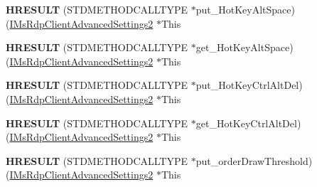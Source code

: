 \begin{DoxyCompactItemize}
\item 
\mbox{\label{struct_m_s_t_s_c_lib_1_1_i_ms_rdp_client_advanced_settings2_vtbl_adf7ed881bcf5a97c28399ccfc1acc3a0}} 
{\bfseries H\+R\+E\+S\+U\+LT} (S\+T\+D\+M\+E\+T\+H\+O\+D\+C\+A\+L\+L\+T\+Y\+PE $\ast$put\+\_\+\+Hot\+Key\+Alt\+Space)(\hyperlink{interface_m_s_t_s_c_lib_1_1_i_ms_rdp_client_advanced_settings2}{I\+Ms\+Rdp\+Client\+Advanced\+Settings2} $\ast$This
\item 
\mbox{\label{struct_m_s_t_s_c_lib_1_1_i_ms_rdp_client_advanced_settings2_vtbl_a23be6ec561ff06251bdad435742d5410}} 
{\bfseries H\+R\+E\+S\+U\+LT} (S\+T\+D\+M\+E\+T\+H\+O\+D\+C\+A\+L\+L\+T\+Y\+PE $\ast$get\+\_\+\+Hot\+Key\+Alt\+Space)(\hyperlink{interface_m_s_t_s_c_lib_1_1_i_ms_rdp_client_advanced_settings2}{I\+Ms\+Rdp\+Client\+Advanced\+Settings2} $\ast$This
\item 
\mbox{\label{struct_m_s_t_s_c_lib_1_1_i_ms_rdp_client_advanced_settings2_vtbl_ae6570304baa485aaf22b2dabfafcd928}} 
{\bfseries H\+R\+E\+S\+U\+LT} (S\+T\+D\+M\+E\+T\+H\+O\+D\+C\+A\+L\+L\+T\+Y\+PE $\ast$put\+\_\+\+Hot\+Key\+Ctrl\+Alt\+Del)(\hyperlink{interface_m_s_t_s_c_lib_1_1_i_ms_rdp_client_advanced_settings2}{I\+Ms\+Rdp\+Client\+Advanced\+Settings2} $\ast$This
\item 
\mbox{\label{struct_m_s_t_s_c_lib_1_1_i_ms_rdp_client_advanced_settings2_vtbl_a46f98c2382a320d21c53aa78280beb2b}} 
{\bfseries H\+R\+E\+S\+U\+LT} (S\+T\+D\+M\+E\+T\+H\+O\+D\+C\+A\+L\+L\+T\+Y\+PE $\ast$get\+\_\+\+Hot\+Key\+Ctrl\+Alt\+Del)(\hyperlink{interface_m_s_t_s_c_lib_1_1_i_ms_rdp_client_advanced_settings2}{I\+Ms\+Rdp\+Client\+Advanced\+Settings2} $\ast$This
\item 
\mbox{\label{struct_m_s_t_s_c_lib_1_1_i_ms_rdp_client_advanced_settings2_vtbl_a530f3d8225026d04831b3ad68624c0c8}} 
{\bfseries H\+R\+E\+S\+U\+LT} (S\+T\+D\+M\+E\+T\+H\+O\+D\+C\+A\+L\+L\+T\+Y\+PE $\ast$put\+\_\+order\+Draw\+Threshold)(\hyperlink{interface_m_s_t_s_c_lib_1_1_i_ms_rdp_client_advanced_settings2}{I\+Ms\+Rdp\+Client\+Advanced\+Settings2} $\ast$This

\end{DoxyCompactItemize}

